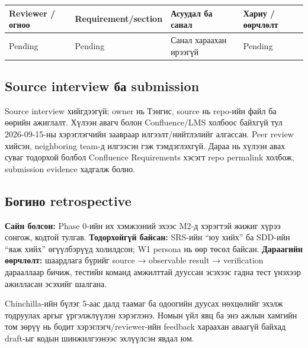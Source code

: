 \documentclass[
  11pt,
  a4paper,
]{article}
\begin{document}
\begin{longtable}[]{@{}
  >{\raggedright\arraybackslash}p{}
  >{\raggedright\arraybackslash}p{}
  >{\raggedright\arraybackslash}p{}
  >{\raggedright\arraybackslash}p{}@{}}
\toprule\noalign{}
\begin{minipage}[b]{\linewidth}\raggedright
Reviewer / огноо
\end{minipage} & \begin{minipage}[b]{\linewidth}\raggedright
Requirement/section
\end{minipage} & \begin{minipage}[b]{\linewidth}\raggedright
Асуудал ба санал
\end{minipage} & \begin{minipage}[b]{\linewidth}\raggedright
Хариу / өөрчлөлт
\end{minipage} \\
\midrule\noalign{}
\endhead
\bottomrule\noalign{}
\endlastfoot
Pending & Pending & Санал хараахан ирээгүй & Pending \\
\end{longtable}

\subsection{Source interview ба
submission}\label{doc7-source-interview-ux431ux430-submission}

Source interview хийгдээгүй; owner нь Тэнгис, source нь repo-ийн файл ба
өөрийн ажиглалт. Хүлээн авагч болон Confluence/LMS холбоос байхгүй тул
2026-09-15-ны хэрэглэгчийн заавраар илгээлт/нийтлэлийг алгассан. Peer
review хийсэн, neighboring team-д илгээсэн гэж тэмдэглэхгүй. Дараа нь
хүлээн авах суваг тодорхой болбол Confluence Requirements хэсэгт repo
permalink холбож, submission evidence хадгалж болно.

\subsection{Богино
retrospective}\label{doc7-ux431ux43eux433ux438ux43dux43e-retrospective}

\textbf{Сайн болсон:} Phase 0-ийн их хэмжээний эхээс M2-д хэрэгтэй жижиг
хүрээ сонгож, кодтой тулгав. \textbf{Тодорхойгүй байсан:} SRS-ийн ``юу
хийх'' ба SDD-ийн ``яаж хийх'' өгүүлбэрүүд холилдсон; W1 persona нь өөр
төсөл байсан. \textbf{Дараагийн өөрчлөлт:} шаардлага бүрийг source →
observable result → verification дарааллаар бичиж, тестийн команд
амжилттай дууссан эсэхээс гадна тест үнэхээр ажилласан эсэхийг шалгана.

Chinchilla-ийн бүлэг 5-аас далд таамаг ба одоогийн дуусах нөхцөлийг
эхэлж тодруулах аргыг үргэлжлүүлэн хэрэглэнэ. Номын үйл явц ба энэ ажлын
хамгийн том зөрүү нь бодит хэрэглэгч/reviewer-ийн feedback хараахан
аваагүй байхад draft-ыг кодын шинжилгээнээс эхлүүлсэн явдал юм.
\end{document}
